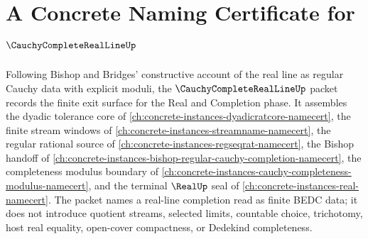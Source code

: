 \chapter{A Concrete Naming Certificate for $\CauchyCompleteRealLineUp$}
\label{ch:concrete-instances-cauchy-complete-real-line-namecert}

Following Bishop and Bridges' constructive account of the real line as regular Cauchy data with explicit moduli, the $\CauchyCompleteRealLineUp$ packet records the finite exit surface for the Real and Completion phase. It assembles the dyadic tolerance core of \autoref{ch:concrete-instances-dyadicratcore-namecert}, the finite stream windows of \autoref{ch:concrete-instances-streamname-namecert}, the regular rational source of \autoref{ch:concrete-instances-regseqrat-namecert}, the Bishop handoff of \autoref{ch:concrete-instances-bishop-regular-cauchy-completion-namecert}, the completeness modulus boundary of \autoref{ch:concrete-instances-cauchy-completeness-modulus-namecert}, and the terminal $\RealUp$ seal of \autoref{ch:concrete-instances-real-namecert}. The packet names a real-line completion read as finite BEDC data; it does not introduce quotient streams, selected limits, countable choice, trichotomy, host real equality, open-cover compactness, or Dedekind completeness.

